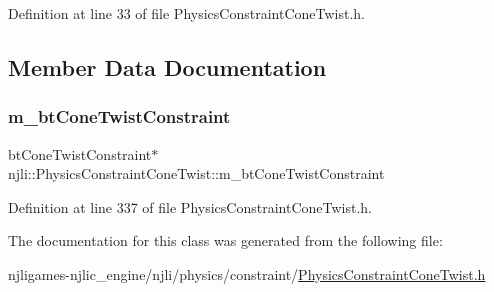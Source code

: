 Definition at line 33 of file Physics\+Constraint\+Cone\+Twist.\+h.



\subsection{Member Data Documentation}
\mbox{\label{classnjli_1_1_physics_constraint_cone_twist_a9a2b6ba85104cb0aacc840dfa28625cf}} 
\subsubsection{\texorpdfstring{m\+\_\+bt\+Cone\+Twist\+Constraint}{m\_btConeTwistConstraint}}
{\footnotesize\ttfamily bt\+Cone\+Twist\+Constraint$\ast$ njli\+::\+Physics\+Constraint\+Cone\+Twist\+::m\+\_\+bt\+Cone\+Twist\+Constraint\hspace{0.3cm}{\ttfamily [private]}}



Definition at line 337 of file Physics\+Constraint\+Cone\+Twist.\+h.



The documentation for this class was generated from the following file\+:\begin{DoxyCompactItemize}
\item 
njligames-\/njlic\+\_\+engine/njli/physics/constraint/\mbox{\hyperlink{_physics_constraint_cone_twist_8h}{Physics\+Constraint\+Cone\+Twist.\+h}}\end{DoxyCompactItemize}
